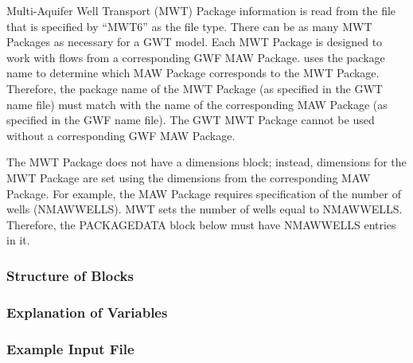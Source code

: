 Multi-Aquifer Well Transport (MWT) Package information is read from the file that is specified by ``MWT6'' as the file type.  There can be as many MWT Packages as necessary for a GWT model. Each MWT Package is designed to work with flows from a corresponding GWF MAW Package. \mf uses the package name to determine which MAW Package corresponds to the MWT Package.  Therefore, the package name of the MWT Package (as specified in the GWT name file) must match with the name of the corresponding MAW Package (as specified in the GWF name file).  The GWT MWT Package cannot be used without a corresponding GWF MAW Package.

The MWT Package does not have a dimensions block; instead, dimensions for the MWT Package are set using the dimensions from the corresponding MAW Package.  For example, the MAW Package requires specification of the number of wells (NMAWWELLS).  MWT sets the number of wells equal to NMAWWELLS.  Therefore, the PACKAGEDATA block below must have NMAWWELLS entries in it.

\vspace{5mm}
\subsubsection{Structure of Blocks}




\vspace{5mm}
\subsubsection{Explanation of Variables}
\begin{description}

\end{description}

\vspace{5mm}
\subsubsection{Example Input File}


\vspace{5mm}
